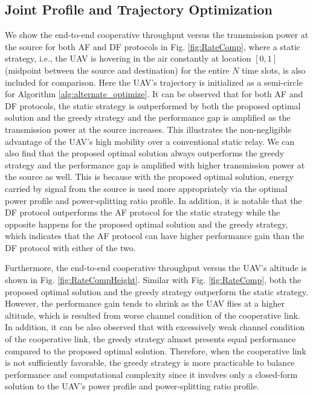 \documentclass[12pt, draftclsnofoot, onecolumn]{IEEEtran}
\begin{document}
\subsection{Joint Profile and Trajectory Optimization}
We show the end-to-end cooperative throughput versus the transmission power at the source for both AF and DF protocols in Fig. \ref{fig:RateComp}, where a static strategy, i.e., the UAV is hovering in the air constantly at location $[0,1]$ (midpoint between the source and destination) for the entire $N$ time slots, is also included for comparison. Here the UAV's trajectory is initialized as a semi-circle for Algorithm \ref{alg:alternate_optimize}. It can be observed that for both AF and DF protocols, the static strategy is outperformed by both the proposed optimal solution and the greedy strategy and the performance gap is amplified as the transmission power at the source increases. This illustrates the non-negligible advantage of the UAV's high mobility over a conventional static relay. We can also find that the proposed optimal solution always outperforms the greedy strategy and the performance gap is amplified with higher transmission power at the source as well. This is because with the proposed optimal solution, energy carried by signal from the source is used more appropriately via the optimal power profile and power-splitting ratio profile. In addition, it is notable that the DF protocol outperforms the AF protocol for the static strategy while the opposite happens for the proposed optimal solution and the greedy strategy, which indicates that the AF protocol can have higher performance gain than the DF protocol with either of the two.

Furthermore, the end-to-end cooperative throughput versus the UAV's altitude is shown in Fig. \ref{fig:RateCompHeight}. Similar with Fig. \ref{fig:RateComp}, both the proposed optimal solution and the greedy strategy outperform the static strategy. However, the performance gain tends to shrink as the UAV flies at a higher altitude, which is resulted from worse channel condition of the cooperative link. In addition, it can be also observed that with excessively weak channel condition of the cooperative link, the greedy strategy almost presents equal performance compared to the proposed optimal solution. Therefore, when the cooperative link is not sufficiently favorable, the greedy strategy is more practicable to balance performance and computational complexity since it involves only a closed-form solution to the UAV's power profile and power-splitting ratio profile.
\end{document}
